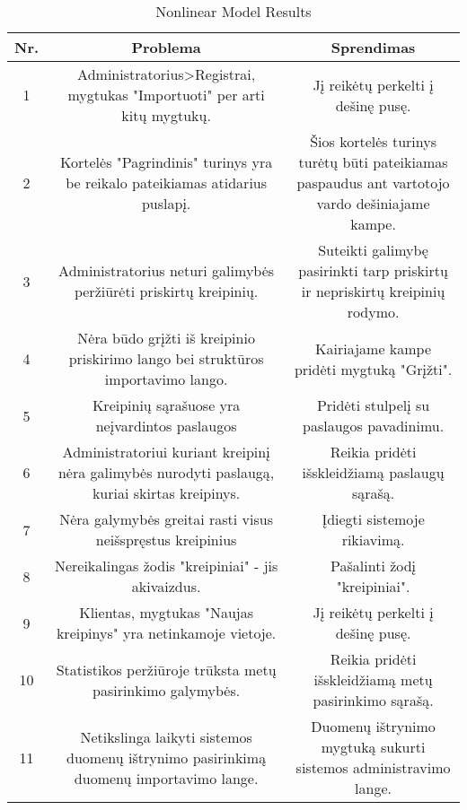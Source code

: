 		\begin{table}[ht] 
		\caption{Nonlinear Model Results} %
		\centering %
			\begin{tabular}{c c c} %
		\hline\hline %
		Nr. & Problema & Sprendimas\\ [0.5ex] %
		\hline %
		1 & Administratorius>Registrai, mygtukas "Importuoti" per arti kitų mygtukų. & Jį reikėtų perkelti į dešinę pusę.\\
		2 & Kortelės "Pagrindinis" turinys yra be reikalo pateikiamas atidarius puslapį. & Šios kortelės turinys turėtų būti pateikiamas paspaudus ant vartotojo vardo dešiniajame kampe.\\
		3 & Administratorius neturi galimybės peržiūrėti priskirtų kreipinių. & Suteikti galimybę pasirinkti tarp priskirtų ir nepriskirtų kreipinių rodymo.\\
		4 & Nėra būdo grįžti iš kreipinio priskirimo lango bei struktūros importavimo lango. & Kairiajame kampe pridėti mygtuką "Grįžti".\\
		5 & Kreipinių sąrašuose yra neįvardintos paslaugos & Pridėti stulpelį su paslaugos pavadinimu.\\
		6 & Administratoriui kuriant kreipinį nėra galimybės nurodyti paslaugą, kuriai skirtas kreipinys. & Reikia pridėti išskleidžiamą paslaugų sąrašą.\\
		7 & Nėra galymybės greitai rasti visus neišspręstus kreipinius & Įdiegti sistemoje rikiavimą.\\
		8 & Nereikalingas žodis "kreipiniai" - jis akivaizdus. & Pašalinti žodį "kreipiniai".\\
		9 & Klientas, mygtukas "Naujas kreipinys" yra netinkamoje vietoje. & Jį reikėtų perkelti į dešinę pusę.\\
		10 & Statistikos peržiūroje trūksta metų pasirinkimo galymybės. & Reikia pridėti išskleidžiamą metų pasirinkimo sąrašą.\\
		11 & Netikslinga laikyti sistemos duomenų ištrynimo pasirinkimą duomenų importavimo lange. & Duomenų ištrynimo mygtuką sukurti sistemos administravimo lange.\\
		\hline %
		\end{tabular} 
		\label{table:nonlin} %
		\end{table} 
	
